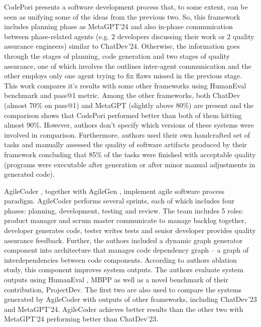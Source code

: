 CodePori \cite{rasheed2024codeporilargescaleautonomoussoftware} presents a software development process that, to some extent, can be seen as unifying some of the ideas from the previous two. So, this framework includes planning phase as MetaGPT'24 and also in-phase communication between phase-related agents (e.g. 2 developers discussing their work or 2 quality assurance engineers) similar to ChatDev'24. Otherwise, the information goes through the stages of planning, code generation and two stages of quality assurance, one of which involves the outlines inter-agent communication and the other employs only one agent trying to fix flaws missed in the previous stage. This work compares it's results with some other frameworks using HumanEval \cite{humaneval} benchmark and pass@1 metric. Among the other frameworks, both ChatDev (almost 70\% on pass@1) and MetaGPT (slightly above 80\%) are present and the comparison shows that CodePori performed better than both of them hitting almost 90\%. However, authors don't specify which versions of these systems were involved in comparison. Furthermore, authors used their own handcrafted set of tasks and manually assessed the quality of software artifacts produced by their framework concluding that 85\% of the tasks were finished with acceptable quality (programs were executable after generation or after minor manual adjustments in generated code). 

AgileCoder \cite{nguyen2024agilecoderdynamiccollaborativeagents}, together with AgileGen \cite{zhang2024empoweringagilebasedgenerativesoftware}, implement agile software process paradigm. AgileCoder performs several sprints, each of which includes four phases: planning, development, testing and review. The team includes 5 roles: product manager and scrum master communicate to manage backlog together, developer generates code, tester writes tests and senior developer provides quality assurance feedback. Further, the authors included a dynamic graph generator component into architecture that manages code dependency graph -- a graph of interdependencies between code components. According to authors ablation study, this component improves system outputs. The authors evaluate system outputs using HumanEval \cite{humaneval}, MBPP\cite{mbpp} as well as a novel benchmark of their contribution, ProjectDev. The first two are also used to compare the systems generated by AgileCoder with outputs of other frameworks, including ChatDev'23 and MetaGPT'24. AgileCoder achieves better results than the other two with MetaGPT'24 performing better than ChatDev'23.

